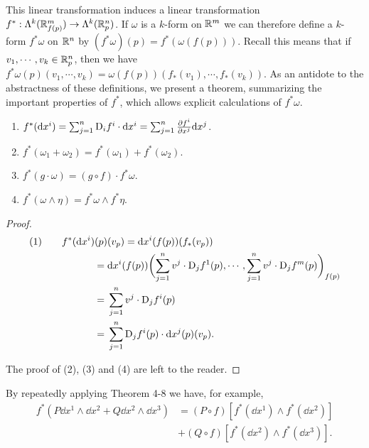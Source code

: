 This linear transformation induces a linear transformation $f^*:\Lambda^k(\mathbb{R}^m_{f(p)})\to \Lambda^k(\mathbb{R}^n_p)$.
If $\omega$ is a $k$-form on $\mathbb{R}^m$ we can therefore define a $k$-form $f^*\omega$ on $\mathbb{R}^n$ by
$(f^*\omega)(p) = f^*(\omega(f(p)))$. Recall this means that if $v_1,\cdots,v_k\in\mathbb{R}^n_p$, then we have 
$f^*\omega(p)(v_1,\cdots,v_k) = \omega(f(p))(f_*(v_1), \cdots, f_*(v_k))$. As an antidote to the abstractness
of these definitions, we present a theorem, summarizing the important properties of $f^*$, which allows explicit 
calculations of $f^*\omega$.

\begin{theorem}
  \begin{enumerate}[label=\upshape{(\arabic*)}]
    \item $f^*(\mathrm{d} x^i) = \sum_{j=1}^{n}{\mathrm{D}_if^i\cdot \mathrm{d} x^i} = \sum_{j=1}^{n}{\frac{\partial f^i}{\partial x^j}\mathrm{d} x^j}$.
    \item $f^*(\omega_1+\omega_2) = f^*(\omega_1) + f^*(\omega_2)$.
    \item $f^*(g\cdot \omega) = (g\circ f)\cdot f^*\omega$.
    \item $f^*(\omega\wedge\eta) = f^*\omega\wedge f^*\eta$.
  \end{enumerate}
\end{theorem}

\begin{proof}
  \begin{align*}
      \text{(1)}\qquad f^*(\mathrm{d} x^i)(p)&(v_p)
        = \mathrm{d} x^i(f(p))(f_*(v_p)) \\
      =\; & \mathrm{d} x^i(f(p))\biggl(\sum_{j=1}^{n}{v^j\cdot \mathrm{D}_jf^1(p)}, \cdots, \sum_{j=1}^{n}{v^j\cdot \mathrm{D}_jf^m(p)}\biggr)_{f(p)} \\
      =\; & \sum_{j=1}^{n}{v^j\cdot \mathrm{D}_jf^i(p)}\\
      =\; & \sum_{j=1}^{n}{\mathrm{D}_jf^i(p)\cdot \mathrm{d} x^j(p)(v_p)}.
  \end{align*}

  The proof of (2), (3) and (4) are left to the reader.
\end{proof}

By repeatedly applying Theorem 4-8 we have, for example,
\begin{align*}
    f^*(P\dd x^1 \wedge \dd x^2 + Q\dd x^2 \wedge \dd x^3)
    & = (P\circ f)\left[f^*(\dd x^1)\wedge f^*(\dd x^2)\right]\\
    & + (Q\circ f)\left[f^*(\dd x^2)\wedge f^*(\dd x^3)\right].
\end{align*}

